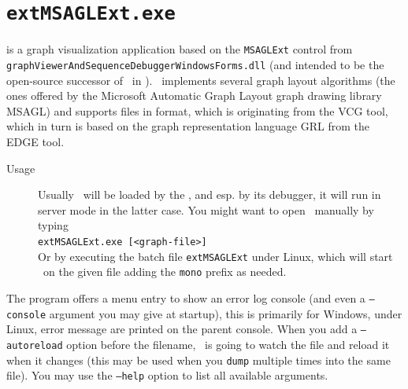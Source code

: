 \section{\texttt{extMSAGLExt.exe}}
\label{tools:extMSAGLExt}
\extMSAGLExt{} is a graph visualization application based on the \texttt{MSAGLExt} control from \texttt{graphViewerAndSequenceDebuggerWindowsForms.dll} (and intended to be the open-source successor of \yComp\ in \GrG).
\extMSAGLExt\ implements several graph layout algorithms (the ones offered by the Microsoft Automatic Graph Layout graph drawing library MSAGL\cite{msagl}) and supports files in  format, which is originating from the VCG\cite{vcg} tool, which in turn is based on the graph representation language GRL from the EDGE\cite{grl} tool.

\begin{description}
  \item[Usage] Usually \extMSAGLExt\ will be loaded by the \GrShell, and esp. by its debugger, it will run in server mode in the latter case. You might want to open \extMSAGLExt\ manually by typing\\
   \texttt{extMSAGLExt.exe [<graph-file>]}\\
  Or by executing the batch file \texttt{extMSAGLExt} under Linux,
  which will start \extMSAGLExt\ on the given file adding the \texttt{mono} prefix as needed.
\end{description}

The program offers a menu entry to show an error log console (and even a \texttt{--console} argument you may give at startup), this is primarily for Windows, under Linux, error message are printed on the parent console.
When you add a \texttt{--autoreload} option before the filename, \extMSAGLExt\ is going to watch the file and reload it when it changes (this may be used when you \texttt{dump} multiple times into the same file).
You may use the \texttt{--help} option to list all available arguments.

